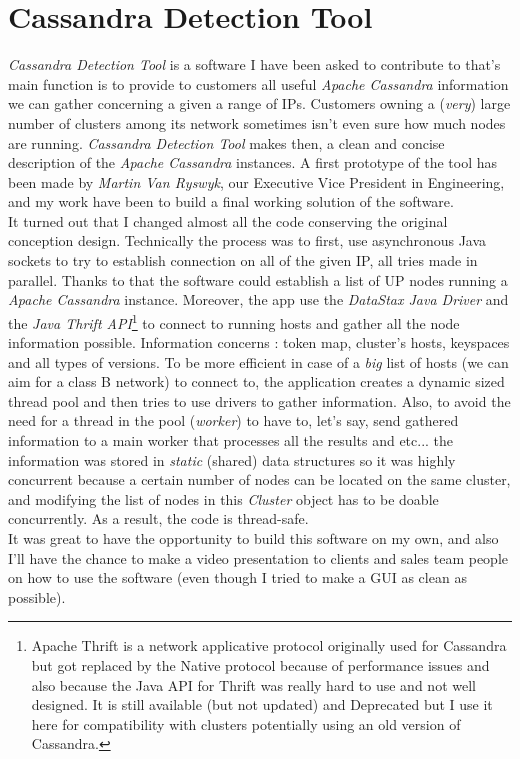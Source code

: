 \documentclass[a4paper]{report}
\newcommand{\djd}{\emph{DataStax Java Driver\xspace}}
\newcommand{\ca}{\emph{Apache Cassandra\xspace}}
\begin{document}
\section{Cassandra Detection Tool}
\emph{Cassandra Detection Tool} is a software I have been asked to contribute to that's main function is to provide to customers all useful \ca{} information we can gather concerning a given a range of IPs. Customers owning a (\emph{very}) large number of clusters among its network sometimes isn't even sure how much nodes are running. \emph{Cassandra Detection Tool} makes then, a clean and concise description of the \ca{} instances. 
A first prototype of the tool has been made by \emph{Martin Van Ryswyk}, our Executive Vice President in Engineering, and my work have been to build a final working solution of the software.\\
It turned out that I changed almost all the code conserving the original conception design. Technically the process was to first, use asynchronous Java sockets to try to establish connection on all of the given IP, all tries made in parallel. Thanks to that the software could establish a list of UP nodes running a \ca{} instance. Moreover, the app use the \djd{} and  the \emph{Java Thrift API}\footnote{Apache Thrift is a network applicative protocol originally used for Cassandra but got replaced by the Native protocol because of performance issues and also because the Java API for Thrift was really hard to use and not well designed. It is still available (but not updated) and Deprecated but I use it here for compatibility with clusters potentially using an old version of Cassandra.}
to connect to running hosts and gather all the node information possible. Information concerns : token map, cluster's hosts, keyspaces and all types of versions. To be more efficient in case of a \emph{big} list of hosts (we can aim for a class B network) to connect to, the application creates a dynamic sized thread pool and then tries to use drivers to gather information. Also, to avoid the need for a thread in the pool (\emph{worker}) to have to, let's say, send gathered information to a main worker that processes all the results and etc... the information was stored in \emph{static} (shared) data structures so it was highly concurrent because a certain number of nodes can be located on the same cluster, and modifying the list of nodes in this \emph{Cluster} object has to be doable concurrently. As a result, the code is thread-safe.\\
It was great to have the opportunity to build this software on my own, and also I'll have the chance to make a video presentation to clients and sales team people on how to use the software (even though I tried to make a GUI as clean as possible).
\end{document}
